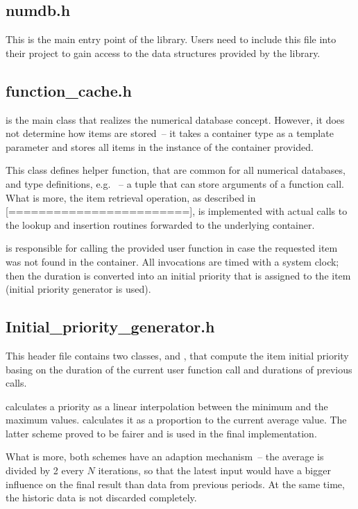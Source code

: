 \subsection{numdb.h}
This is the main entry point of the \numdbname library. Users need to include this file into their project to gain access to the data structures provided by the library.
\subsection{function\_cache.h}
 is the main class that realizes the numerical database concept. However, it does not determine how items are stored~-- it takes a container type as a template parameter and stores all items in the instance of the container provided.

This class defines helper function, that are common for all numerical databases, and type definitions, e.g. ~-- a tuple that can store arguments of a function call. What is more, the item retrieval operation, as described in [========================], is implemented with actual calls to the lookup and insertion routines forwarded to the underlying container.

 is responsible for calling the provided user function in case the requested item was not found in the container. All invocations are timed with a system clock; then the duration is converted into an initial priority that is assigned to the item (initial priority generator is used).

\subsection{Initial\_priority\_generator.h}
This header file contains two classes,  and , that compute the item initial priority basing on the duration of the current user function call and durations of previous calls.

 calculates a priority as a linear interpolation between the minimum and the maximum values.  calculates it as a proportion to the current average value. The latter scheme proved to be fairer and is used in the final implementation.

What is more, both schemes have an adaption mechanism~-- the average is divided by 2 every $N$ iterations, so that the latest input would have a bigger influence on the final result than data from previous periods. At the same time, the historic data is not discarded completely.

